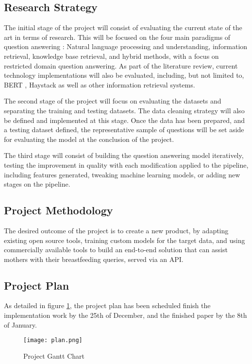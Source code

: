 \subsection{Research Strategy}
The initial stage of the project will consist of evaluating the current state of the art in terms of research. This will be focused on the four main paradigms of question answering \cite{CALIJORNESOARES2020635}: Natural language processing and understanding, information retrieval, knowledge base retrieval, and hybrid methods, with a focus on restricted domain question answering. As part of the literature review, current technology implementations will also be evaluated, including, but not limited to, BERT \cite{devlin2018bert}, Haystack \cite{haystack.whatis} as well as other information retrieval systems.

The second stage of the project will focus on evaluating the datasets and separating the training and testing datasets. The data cleaning strategy will also be defined and implemented at this stage. Once the data has been prepared, and a testing dataset defined, the representative sample of questions will be set aside for evaluating the model at the conclusion of the project.

The third stage will consist of building the question answering model iteratively, testing the improvement in quality with each modification applied to the pipeline, including features generated, tweaking machine learning models, or adding new stages on the pipeline.


\subsection{Project Methodology}
The desired outcome of the project is to create a new product, by adapting existing open source tools, training custom models for the target data, and using commercially available tools to build an end-to-end solution that can assist mothers with their breastfeeding queries, served via an API.

\subsection{Project Plan}
As detailed in figure \ref{fig:gantt}, the project plan has been scheduled finish the implementation work by the 25th of December, and the finished paper by the 8th of January.

\begin{figure}[h]
	\caption{Project Gantt Chart}
	\centering
	\texttt{[image: plan.png]}
	\label{fig:gantt}
\end{figure}

